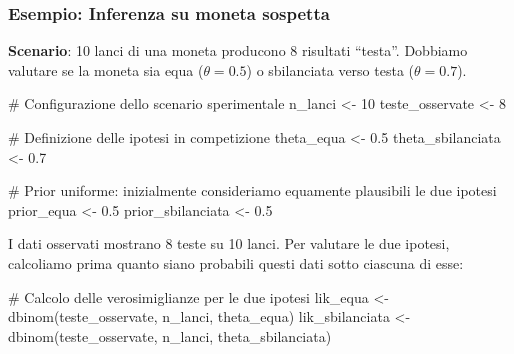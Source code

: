 \documentclass[
  letterpaper,
  DIV=11,
  numbers=noendperiod,
  oneside]{scrreprt}
\newenvironment{Shaded}{\begin{snugshade}}{\end{snugshade}}
\newcommand{\CommentTok}[1]{\textcolor[rgb]{0.37,0.37,0.37}{#1}}
\newcommand{\DecValTok}[1]{\textcolor[rgb]{0.68,0.00,0.00}{#1}}
\newcommand{\FloatTok}[1]{\textcolor[rgb]{0.68,0.00,0.00}{#1}}
\newcommand{\FunctionTok}[1]{\textcolor[rgb]{0.28,0.35,0.67}{#1}}
\newcommand{\NormalTok}[1]{\textcolor[rgb]{0.00,0.23,0.31}{#1}}
\newcommand{\OtherTok}[1]{\textcolor[rgb]{0.00,0.23,0.31}{#1}}
\theoremstyle{definition}
\theoremstyle{plain}
\theoremstyle{definition}
\theoremstyle{remark}
\begin{document}
\begin{tcolorbox}[enhanced jigsaw, arc=.35mm, breakable, colbacktitle=quarto-callout-note-color!10!white, opacityback=0, toprule=.15mm, rightrule=.15mm, colback=white, opacitybacktitle=0.6, leftrule=.75mm, coltitle=black, bottomtitle=1mm, left=2mm, toptitle=1mm, title=\textcolor{quarto-callout-note-color}{\faInfo}\hspace{0.5em}{Confronto tra approccio bayesiano e frequentista}, titlerule=0mm, bottomrule=.15mm, colframe=quarto-callout-note-color-frame]

\subsubsection*{Esempio: Inferenza su moneta
sospetta}\label{esempio-inferenza-su-moneta-sospetta}

\textbf{Scenario}: 10 lanci di una moneta producono 8 risultati
``testa''. Dobbiamo valutare se la moneta sia equa (\(\theta = 0.5\)) o
sbilanciata verso testa (\(\theta = 0.7\)).

\begin{Shaded}
\begin{Highlighting}[]
\CommentTok{\# Configurazione dello scenario sperimentale}
\NormalTok{n\_lanci }\OtherTok{\textless{}{-}} \DecValTok{10}
\NormalTok{teste\_osservate }\OtherTok{\textless{}{-}} \DecValTok{8}

\CommentTok{\# Definizione delle ipotesi in competizione}
\NormalTok{theta\_equa }\OtherTok{\textless{}{-}} \FloatTok{0.5}
\NormalTok{theta\_sbilanciata }\OtherTok{\textless{}{-}} \FloatTok{0.7}

\CommentTok{\# Prior uniforme: inizialmente consideriamo equamente plausibili le due ipotesi}
\NormalTok{prior\_equa }\OtherTok{\textless{}{-}} \FloatTok{0.5}
\NormalTok{prior\_sbilanciata }\OtherTok{\textless{}{-}} \FloatTok{0.5}
\end{Highlighting}
\end{Shaded}

I dati osservati mostrano 8 teste su 10 lanci. Per valutare le due
ipotesi, calcoliamo prima quanto siano probabili questi dati sotto
ciascuna di esse:

\begin{Shaded}
\begin{Highlighting}[]
\CommentTok{\# Calcolo delle verosimiglianze per le due ipotesi}
\NormalTok{lik\_equa }\OtherTok{\textless{}{-}} \FunctionTok{dbinom}\NormalTok{(teste\_osservate, n\_lanci, theta\_equa)}
\NormalTok{lik\_sbilanciata }\OtherTok{\textless{}{-}} \FunctionTok{dbinom}\NormalTok{(teste\_osservate, n\_lanci, theta\_sbilanciata)}


\end{Highlighting}
\end{Shaded}
\end{tcolorbox}
\end{document}
